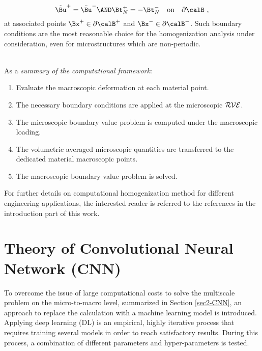 \documentclass[final,3p,times]{elsarticle}
\begin{document}
\begin{equation}
\tilde\Bu^+ = \tilde\Bu^- 
\AND
\Bt_N^+ = -\Bt_N^-
\quad \mbox{on} \quad
\partial\calB \ ,
\label{eq:homo11}
\end{equation}
%
at associated points $\Bx^+\in\partial\calB^+$ and
$\Bx^-\in\partial\calB^-$. Such boundary
conditions are the most reasonable choice for the homogenization
analysis under consideration, even for microstructures which are
non-periodic. 
\\
\\
{As a {\it summary of the computational framework}:
\begin{enumerate} 
\item Evaluate the macroscopic deformation at each material point. \item The necessary boundary conditions are applied at the microscopic $\cal{RVE}$. \item The microscopic boundary value problem is computed under the macroscopic loading. \item The volumetric averaged microscopic quantities are transferred to the dedicated material macroscopic points. \item The macroscopic boundary value problem is solved. 
\end{enumerate} 
For further details on computational homogenization method for different engineering applications, the interested reader is referred to the references in the introduction part of this work.}





\section{Theory of Convolutional Neural Network (CNN)}
\label{sec3-CNN}
To overcome the issue of large computational costs to solve the multiscale problem on the micro-to-macro level, summarized in Section \ref{sec2-CNN}, an approach to replace the calculation with a machine learning model is introduced. Applying deep learning (DL) is an empirical, highly iterative process that requires training several models in order to reach satisfactory results. During this process, a combination of different parameters and hyper-parameters is tested.
\end{document}
